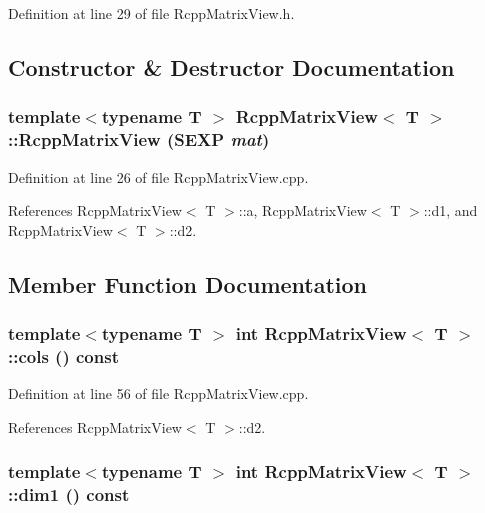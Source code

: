 Definition at line 29 of file RcppMatrixView.h.

\subsection{Constructor \& Destructor Documentation}
\hypertarget{classRcppMatrixView_ac3489c6a24c2975f3ea7103ada50e328}{
\subsubsection[{RcppMatrixView}]{\setlength{\rightskip}{0pt plus 5cm}template$<$typename T $>$ {\bf RcppMatrixView}$<$ T $>$::{\bf RcppMatrixView} (SEXP {\em mat})}}
\label{classRcppMatrixView_ac3489c6a24c2975f3ea7103ada50e328}


Definition at line 26 of file RcppMatrixView.cpp.

References RcppMatrixView$<$ T $>$::a, RcppMatrixView$<$ T $>$::d1, and RcppMatrixView$<$ T $>$::d2.

\subsection{Member Function Documentation}
\hypertarget{classRcppMatrixView_a417b875d8d7dde8130c3b294312c930d}{
\subsubsection[{cols}]{\setlength{\rightskip}{0pt plus 5cm}template$<$typename T $>$ int {\bf RcppMatrixView}$<$ T $>$::cols () const}}
\label{classRcppMatrixView_a417b875d8d7dde8130c3b294312c930d}


Definition at line 56 of file RcppMatrixView.cpp.

References RcppMatrixView$<$ T $>$::d2.\hypertarget{classRcppMatrixView_a72d1d7fcdc4b1cc6dd877b1df2f9f5e6}{
\subsubsection[{dim1}]{\setlength{\rightskip}{0pt plus 5cm}template$<$typename T $>$ int {\bf RcppMatrixView}$<$ T $>$::dim1 () const}}
\label{classRcppMatrixView_a72d1d7fcdc4b1cc6dd877b1df2f9f5e6}


